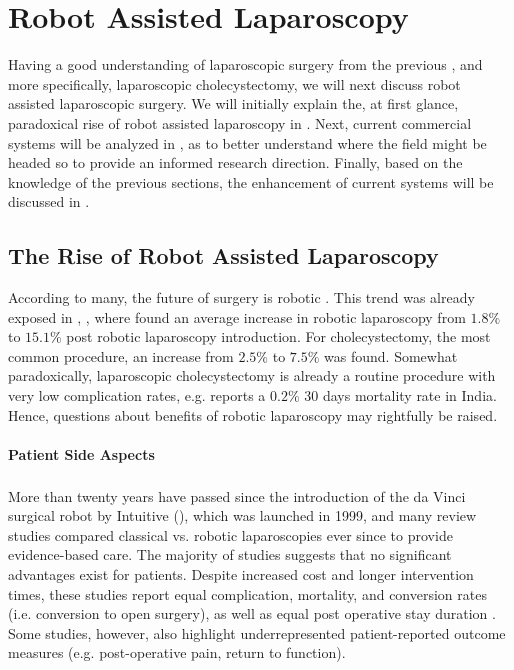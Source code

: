 \section{Robot Assisted Laparoscopy}
\label{in:sec:robot_assisted_laparoscopy}
Having a good understanding of laparoscopic surgery from the previous , and more specifically, laparoscopic cholecystectomy, we will next discuss robot assisted laparoscopic surgery. We will initially explain the, at first glance, paradoxical rise of robot assisted laparoscopy in . Next, current commercial systems will be analyzed in , as to better understand where the field might be headed so to provide an informed research direction. Finally, based on the knowledge of the previous sections, the enhancement of current systems will be discussed in .

\subsection{The Rise of Robot Assisted Laparoscopy}
\label{in:sec:the_rise_of_robot_assisted_laparoscopy}
According to many, the future of surgery is robotic \cite{times2021better}. This trend was already exposed in , , where \cite{sheetz2020trends} found an average increase in robotic laparoscopy from $1.8\%$ to $15.1\%$ post robotic laparoscopy introduction. For cholecystectomy, the most common procedure, an increase from $2.5\%$ to $7.5\%$ was found. Somewhat paradoxically, laparoscopic cholecystectomy is already a routine procedure with very low complication rates, \cite{thapar2023evaluation} e.g. reports a $0.2\%$ 30 days mortality rate in India. Hence, questions about benefits of robotic laparoscopy may rightfully be raised.

\paragraph{Patient Side Aspects} More than twenty years have passed since the introduction of the da Vinci\textsuperscript{\textregistered} surgical robot by Intuitive (), which was launched in 1999, and many review studies compared classical vs. robotic laparoscopies ever since to provide evidence-based care. The majority of studies suggests that no significant advantages exist for patients. Despite increased cost and longer intervention times, these studies report equal complication, mortality, and conversion rates (i.e. conversion to open surgery), as well as equal post operative stay duration \cite{kawka2023laparoscopic, csirzo2023robot}. Some studies, however, also highlight underrepresented patient-reported outcome measures \cite{kawka2023laparoscopic} (e.g. post-operative pain, return to function). 

